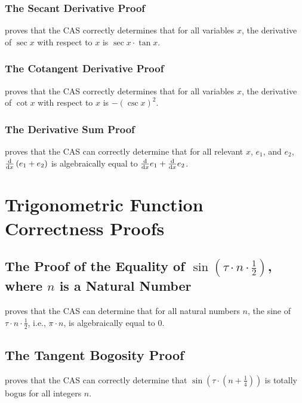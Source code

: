 \documentclass{report}
\begin{document}
\subsubsection{The Secant Derivative Proof}
  proves that the  CAS correctly determines that for all variables \(x\), the derivative of \(\sec x\) with respect to \(x\) is \(\sec x \cdot \tan x\).

\subsubsection{The Cotangent Derivative Proof}
  proves that the  CAS correctly determines that for all variables \(x\), the derivative of \(\cot x\) with respect to \(x\) is \(- \left(\csc x\right)^2\).

\subsubsection{The Derivative Sum Proof}
  proves that the  CAS can correctly determine that for all relevant \(x\), \(e_1\), and \(e_2\), \(\derivative{x} \left(e_1 + e_2\right)\) is algebraically equal to \(\derivative{x} e_1 + \derivative{x} e_2\).

\section{Trigonometric Function Correctness Proofs}
\subsection{The Proof of the Equality of \(\operatorname{sin} \left(\tau \cdot n \cdot \frac12\right)\), where \(n\) is a Natural Number}
  proves that the  CAS can determine that for all natural numbers \(n\), the sine of \(\tau \cdot n \cdot \frac12\), i.e., \(\pi \cdot n\), is algebraically equal to \(0\).

\subsection{The Tangent Bogosity Proof}
  proves that the  CAS can correctly determine that \(\sin \left(\tau \cdot \left(n + \frac{1}{4}\right)\right)\) is totally bogus for all integers \(n\).
\end{document}
